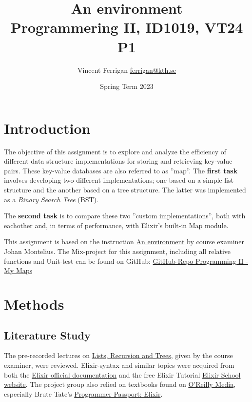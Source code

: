 \documentclass[a4paper,11pt]{article}
\begin{document}
\title{
    An environment
\\\small{Programmering II, ID1019, VT24 P1}
}
\author{Vincent Ferrigan \href{mailto:ferrigan@kth.se}{ferrigan@kth.se}}

\date{Spring Term 2023}

\maketitle

\section*{Introduction}
\label{sec:introduction}
The objective of this assignment is to explore and analyze
the efficiency of
different data structure implementations for storing
and retrieving key-value pairs.
These key-value databases are also referred to as ''map''.
The \textbf{first task} involves developing two different implementations;
one based on a simple list structure and the
another based on a tree structure.
The latter was implemented as a \emph{Binary Search Tree} (BST).

The \textbf{second task} is to compare these two ''custom implementations'',
both with eachother and, in terms of performance, with
Elixir's built-in Map module.

This assignment is based on the instruction
\href{https://people.kth.se/~johanmon/courses/id1019/seminars/environment/environment.pdf}{An environment}
by course examiner Johan Montelius.
The Mix-project for this assignment, including all relative functions and Unit-test can be found on GitHub:
\href{https://github.com/VincentFerrigan/kth-id1019-programming-ii/tree/main/tasks/2/mymaps}{GitHub-Repo Programming II - My Maps}%

\section*{Methods}
\label{sec:methods}

\subsection*{Literature Study}
\label{subsec:methods}
The pre-recorded lectures on
\href{https://canvas.kth.se/courses/44911/assignments/syllabus}{Lists, Recursion and Trees},
given by the course examiner, were reviewed.
Elixir-syntax and similar topics were acquired
from both the
\href{https://elixir-lang.org/docs.html}{Elixir official documentation}
and the free Elixir Tutorial
\href{https://elixirschool.com/en}{Elixir School
website}.
The project group also relied on textbooks found on
\href{https://learning.oreilly.com}{O'Reilly Media},
especially Brute Tate's
\href{https://learning.oreilly.com/library/view/programmer-passport-elixir/9781680509649/}{Programmer Passport: Elixir}.
\end{document}
